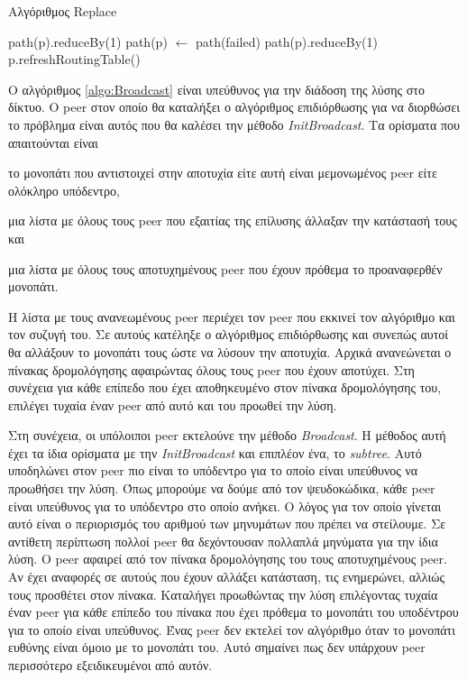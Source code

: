 \begin{algorithm}
\caption{Αλγόριθμος Replace}
\label{algo:Replace}
\begin{algorithmic}[1]
            \State path(p).reduceBy(1)
        \Else
	            \State path(p) $\gets$ path(failed)
            \Else
                \State path(p).reduceBy(1)
            \EndIf
        \EndIf
        \State p.refreshRoutingTable()
    \EndProcedure
\end{algorithmic}
\end{algorithm}

Ο αλγόριθμος \ref{algo:Broadcast} είναι υπεύθυνος για την διάδοση της 
λύσης στο δίκτυο. Ο peer στον οποίο θα καταλήξει ο αλγόριθμος επιδιόρθωσης %
για να διορθώσει το πρόβλημα είναι αυτός που θα καλέσει την μέθοδο 
\textit{InitBroadcast}. Τα ορίσματα που απαιτούνται είναι 
\begin{inparaenum}
\item το μονοπάτι που αντιστοιχεί στην αποτυχία είτε αυτή είναι μεμονωμένος
peer είτε ολόκληρο υπόδεντρο,
\item μια λίστα με όλους τους peer που εξαιτίας της επίλυσης άλλαξαν την 
κατάστασή τους και
\item μια λίστα με όλους τους αποτυχημένους peer που έχουν πρόθεμα το 
προαναφερθέν μονοπάτι.
\end{inparaenum}
Η λίστα με τους ανανεωμένους peer περιέχει τον peer που εκκινεί τον 
αλγόριθμο και τον συζυγή του. Σε αυτούς κατέληξε ο αλγόριθμος επιδιόρθωσης 
και συνεπώς αυτοί θα αλλάξουν το μονοπάτι τους ώστε να λύσουν την αποτυχία. 
Αρχικά ανανεώνεται ο πίνακας δρομολόγησης αφαιρώντας όλους τους peer που 
έχουν αποτύχει. Στη συνέχεια για κάθε επίπεδο που έχει αποθηκευμένο στον 
πίνακα δρομολόγησης του, επιλέγει τυχαία έναν peer από αυτό και του προωθεί 
την λύση. 

Στη συνέχεια, οι υπόλοιποι peer εκτελούνε την μέθοδο \textit{Broadcast}. 
Η μέθοδος αυτή έχει τα ίδια ορίσματα με την \textit{InitBroadcast} και 
επιπλέον ένα, το \textit{subtree}. Αυτό υποδηλώνει στον peer πιο είναι το 
υπόδεντρο για το οποίο είναι υπεύθυνος να προωθήσει την λύση. Όπως μπορούμε 
να δούμε από τον ψευδοκώδικα, κάθε peer είναι υπεύθυνος για το υπόδεντρο στο 
οποίο ανήκει. Ο λόγος για τον οποίο γίνεται αυτό είναι ο περιορισμός του 
αριθμού των μηνυμάτων που πρέπει να στείλουμε. Σε αντίθετη περίπτωση πολλοί 
peer θα δεχόντουσαν πολλαπλά μηνύματα για την ίδια λύση. Ο peer αφαιρεί από 
τον πίνακα δρομολόγησης του τους αποτυχημένους peer. Αν έχει αναφορές σε 
αυτούς που έχουν αλλάξει κατάσταση, τις ενημερώνει, αλλιώς 
τους προσθέτει στον πίνακα. Καταλήγει προωθώντας την λύση επιλέγοντας τυχαία 
έναν peer για κάθε επίπεδο του πίνακα που έχει πρόθεμα το μονοπάτι του 
υποδέντρου για το οποίο είναι υπεύθυνος. Ένας peer δεν εκτελεί τον αλγόριθμο 
όταν το μονοπάτι ευθύνης είναι όμοιο με το μονοπάτι του. Αυτό σημαίνει πως 
δεν υπάρχουν peer περισσότερο εξειδικευμένοι από αυτόν.

